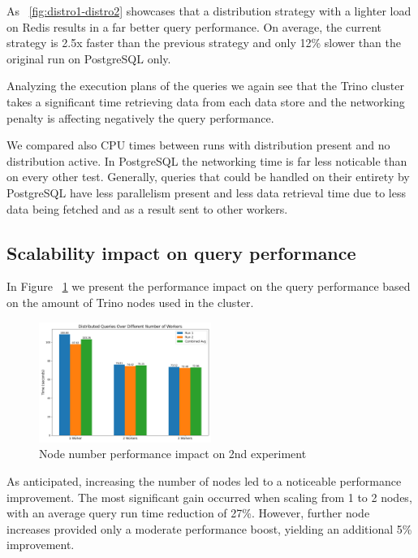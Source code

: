 \documentclass[conference]{IEEEtran}
\begin{document}
As ~\ref{fig:distro1-distro2} showcases that a distribution strategy with a lighter load on Redis results in a far better query performance. On average, the current strategy is 2.5x faster than the previous strategy and only 12\% slower than the original run on PostgreSQL only.

Analyzing the execution plans of the queries we again see that the Trino cluster takes a significant time retrieving data from each data store and the networking penalty is affecting negatively the query performance.

We compared also CPU times between runs with distribution present and no distribution active. In PostgreSQL the networking time is far less noticable than on every other test. Generally, queries that could be handled on their entirety by PostgreSQL have less parallelism present and less data retrieval time due to less data being fetched and as a result sent to other workers.

\subsection{Scalability impact on query performance}
\label{sec:scalability-impact-on-query-performance}

In Figure ~\ref{fig:distro-workers} we present the performance impact on the query performance based on the amount of Trino nodes used in the cluster.

\begin{figure}[h]
	\centering
	\includegraphics[width=0.5\textwidth]{images/dist_worker_count/dist_queries_over_workers.png}
	\caption{Node number performance impact on 2nd experiment}
	\label{fig:distro-workers}
\end{figure}

As anticipated, increasing the number of nodes led to a noticeable performance improvement. The most significant gain occurred when scaling from 1 to 2 nodes, with an average query run time reduction of 27\%. However, further node increases provided only a moderate performance boost, yielding an additional 5\% improvement.
\end{document}
